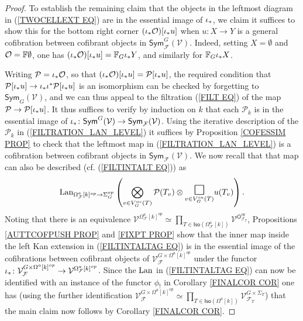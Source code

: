 \documentclass[a4paper,10pt]{article}%
\begin{document}
\begin{proof}
To establish the remaining claim that the objects 
in the leftmost diagram in
(\ref{TWOCELLEXT EQ})
are in the essential image of $\iota_{\**}$,
we claim
it suffices to show this for the bottom right corner 
$(\iota_{\**} \mathcal{O})[\iota_{\**} u]$ when $u \colon X \to Y$ is a general cofibration between cofibrant objects in 
$\mathsf{Sym}^{G}_{\mathcal{F}}(\mathcal{V})$.
Indeed, setting  $X=\emptyset$ and $\mathcal{O}=\mathbb{F} \emptyset$, 
one has 
$(\iota_{\**} \mathcal{O})[\iota_{\**} u] = 
\mathbb{F}_{G} \iota_{\**} Y$, and similarly for $\mathbb{F}_{G} \iota_{\**} X$.

Writing $\mathcal{P} = \iota_{\**} \mathcal{O}$, so that 
$(\iota_{\**} \mathcal{O})[\iota_{\**} u] = \mathcal{P}[\iota_{\**} u]$,
the required condition that
$\mathcal{P}[\iota_{\**} u] \to \iota_{\**} \iota^{\**}\mathcal{P}[\iota_{\**} u]$
is an isomorphism can be checked by forgetting to 
$\mathsf{Sym}_G(\mathcal{V})$, and we can thus appeal to the filtration 
(\ref{FILT EQ}) of the map
$ \mathcal{P} \to \mathcal{P}[\iota_{\**} u]$. It thus suffices to verify by induction on $k$ that each 
$\mathcal{P}_k$ is in the essential image of 
$\iota_{\**} \colon \mathsf{Sym}^G(\mathcal{V})
\to \mathsf{Sym}_{\mathcal{F}}(\mathcal{V})$.
Using the iterative description 
of the $\mathcal{P}_k$ in
(\ref{FILTRATION_LAN_LEVEL})
it suffices by
Proposition \ref{COFESSIM PROP}
to check that the leftmost map in (\ref{FILTRATION_LAN_LEVEL}) is
a cofibration between cofibrant objects in 
$\mathsf{Sym}_{\mathcal{F}}(\mathcal{V})$.
We now recall that that map can also be described 
(cf. (\ref{FILTINTALT EQ})) as
\begin{equation}\label{FILTINTALTAG EQ}
	\Lan_{\Omega_{\mathcal{F}}^a[k]^{op} \to \Sigma_G^{op}}
	\left(
		\bigotimes\limits_{v \in V_{G}^{ac}(T)}\P(T_v) \otimes
		\underset{v \in V_{G}^{in}(T)}
		{\mathlarger{\mathlarger{\mathlarger{\square}}}}
		u(T_v)
	\right).
\end{equation}
Noting that there is an equivalence
$\mathcal{V}^{\Omega_{\mathcal{F}}^a[k]^{op}} \simeq
\prod_{T \in \mathsf{Iso}(\Omega_{\mathcal{F}}^a[k])}
\mathcal{V}^{\mathsf{O}^{op}_{\mathcal{F}_T}}$,
Propositions \ref{AUTTCOFPUSH PROP}
and \ref{FIXPT PROP} show that the 
inner map inside the left Kan extension in (\ref{FILTINTALTAG EQ})
is in the essential image
of the cofibrations between cofibrant objects of
$\mathcal{V}^{G \times \Omega^a[k]^{op}}_{\mathcal{F}}$
under the functor
$\iota_{\**} \colon
\mathcal{V}^{G \times \Omega^a[k]^{op}}_{\mathcal{F}}
\to
\mathcal{V}^{\Omega^a_{\mathcal{F}}[k]^{op}}$.
Since the $\operatorname{Lan}$ in (\ref{FILTINTALTAG EQ})
can now be identified with an instance of the functor $\phi_!$ 
in Corollary \ref{FINALCOR COR} one has 
(using the further identification
$\mathcal{V}^{G \times \Omega^a[k]^{op}}_{\mathcal{F}} \simeq
\prod_{T \in \mathsf{Iso}(\Omega^a[k])}
\mathcal{V}^{G \times \Sigma_T}_{\mathcal{F}_T}$)
that the main claim now follows by Corollary \ref{FINALCOR COR}.


\end{proof}
\end{document}
